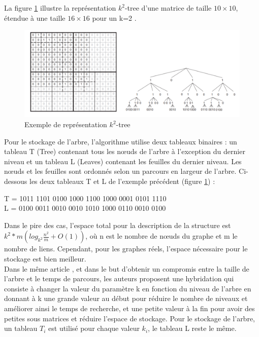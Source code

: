 La figure \ref{k2-trees-exemples} illustre la représentation $k^2$-tree d'une matrice de taille $10 \times 10$, étendue à une  taille $16 \times 16$ pour un k=2 \citep{brisaboa2015efficient}.

\begin{figure}[H]
\begin{center}
\includegraphics[height=200 pt, width=450 pt]{./ressources/image/k2-trees.png} 
\end{center}
\caption{Exemple de représentation $k^2$-tree}
\label{k2-trees-exemples}
\end{figure}


Pour le stockage de l'arbre, l'algorithme utilise deux tableaux binaires : un tableau T (Tree) contenant tous les nœuds de l'arbre à l'exception du dernier niveau et un tableau L (Leaves) contenant les feuilles du dernier niveau. Les nœuds et les feuilles sont ordonnés selon un parcours en largeur de l'arbre.   
Ci-dessous les deux tableaux T et L de l'exemple précédent (figure \ref{k2-trees-exemples}) : \\
\begin{center}
	T = 1011 1101 0100 1000 1100 1000 0001 0101 1110\\
	L = 0100 0011 0010 0010 1010 1000 0110 0010 0100\\	
\end{center}
Dans le pire des cas, l'espace total pour la description de la structure est $k^2*m(log_{k^2}\frac{n^2}{m}+ \textit{O}(1))$, où n est le nombre de nœuds du graphe et m le nombre de liens. Cependant, pour les graphes réels, l'espace nécessaire pour le stockage est bien meilleur. \\

Dans le même article \citep{brisaboa2009k}, et dans le but d'obtenir un compromis entre la taille de l'arbre et le temps de parcours, les auteurs proposent une hybridation qui consiste à changer la valeur du paramètre k en fonction du niveau de l'arbre en donnant à k une grande valeur au début pour réduire le nombre de niveaux et améliorer ainsi le temps de recherche, et une petite valeur à la fin pour avoir des petites sous matrices et réduire l'espace de stockage.
Pour le stockage de l'arbre, un tableau $T_{i}$ est utilisé pour chaque valeur $k_{i}$, le tableau L reste le même.\\

